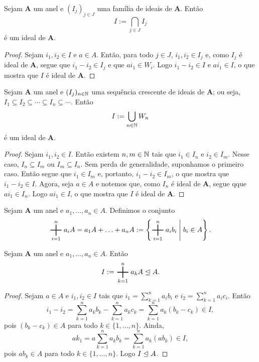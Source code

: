 \begin{prop}
	Sejam $\bm A$ um anel e $(I_j)_{j \in J}$ uma família de ideais de $\bm A$. Então
	\begin{equation*}
	I := \bigcap_{j \in J} I_j
	\end{equation*}
é um ideal de $\bm A$.
\end{prop}
\begin{proof}
	Sejam $i_1,i_2 \in I$ e $a \in A$. Então, para todo $j \in J$, $i_1,i_2 \in I_j$ e, como $I_j$ é ideal de $\bm A$, segue que $i_1-i_2 \in I_j$ e que $ai_1 \in W_i$. Logo $i_1-i_2 \in I$ e $ai_1 \in I$, o que mostra que $I$ é ideal de $\bm A$.
\end{proof}

\begin{prop}
	Sejam $\bm A$ um anel e $(I_j)_{n \in \mathbb{N}}$ uma sequência crescente de ideais de $\bm A$; ou seja, $I_1 \subseteq I_2 \subseteq \cdots \subseteq I_n \subseteq \cdots$. Então
	\begin{equation*}
	I := \bigcup_{n \in \mathbb{N}} W_n
	\end{equation*}
é um ideal de $\bm A$.
\end{prop}
\begin{proof}
	Sejam $i_1,i_2 \in I$. Então existem $n,m \in \mathbb{N}$ tais que $i_1 \in I_n$ e $i_2 \in I_m$. Nesse caso, $I_n \subseteq I_m$ ou $I_m \subseteq I_n$. Sem perda de generalidade, suponhamos o primeiro caso. Então segue que $i_1 \in I_m$ e, portanto, $i_1-i_2 \in I_m$, o que mostra que $i_1-i_2 \in I$. Agora, seja $a \in A$ e notemos que, como $I_n$ é ideal de $\bm A$, segue qque $ai_1 \in I_n$. Logo $ai_1 \in I$, o que mostra que $I$ é ideal de $\bm A$.
\end{proof}


\begin{defi}
	Sejam $\bm A$ um anel e $a_1,\ldots,a_n \in A$. Definimos o conjunto
	\begin{equation*}
	\sum_{i=1}^n a_iA = a_1A + \ldots + a_nA := \set{\sum_{i=1}^n a_ib_i}{b_i \in A}.
	\end{equation*}
\end{defi}

\begin{prop}
	Sejam $\bm A$ um anel e $a_1,\ldots,a_n \in A$. Então
	\begin{equation*}
	I := \sum_{k=1}^n a_kA \ide A.
	\end{equation*}
\end{prop}
\begin{proof}
	Sejam $a \in A$ e $i_1,i_2 \in I$ tais que $i_1=\sum_{k=1}^n a_ib_i$ e $i_2=\sum_{k=1}^n a_ic_i$. Então
	\begin{equation*}
	i_1-i_2=\sum_{k=1}^n a_kb_k - \sum_{k=1}^n a_kc_k = \sum_{k=1}^n a_k(b_k-c_k) \in I,
	\end{equation*}
pois $(b_k-c_k) \in A$ para todo $k \in \{1,\ldots,n\}$. Ainda,
	\begin{equation*}
	ak_1=a\sum_{k=1}^n a_kb_k= \sum_{k=1}^n a_k(ab_k) \in I,
	\end{equation*}
pois $ab_k \in A$ para todo $k \in \{1,\ldots,n\}$. Logo $I \mathrel{\unlhd} A$.
\end{proof}


